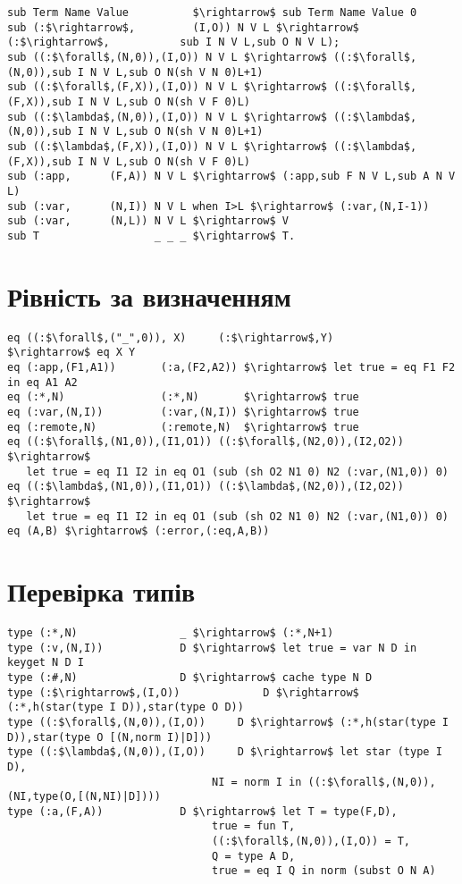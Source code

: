 \begin{lstlisting}[mathescape=true]
sub Term Name Value          $\rightarrow$ sub Term Name Value 0
sub (:$\rightarrow$,         (I,O)) N V L $\rightarrow$ (:$\rightarrow$,           sub I N V L,sub O N V L);
sub ((:$\forall$,(N,0)),(I,O)) N V L $\rightarrow$ ((:$\forall$,(N,0)),sub I N V L,sub O N(sh V N 0)L+1)
sub ((:$\forall$,(F,X)),(I,O)) N V L $\rightarrow$ ((:$\forall$,(F,X)),sub I N V L,sub O N(sh V F 0)L)
sub ((:$\lambda$,(N,0)),(I,O)) N V L $\rightarrow$ ((:$\lambda$,(N,0)),sub I N V L,sub O N(sh V N 0)L+1)
sub ((:$\lambda$,(F,X)),(I,O)) N V L $\rightarrow$ ((:$\lambda$,(F,X)),sub I N V L,sub O N(sh V F 0)L)
sub (:app,      (F,A)) N V L $\rightarrow$ (:app,sub F N V L,sub A N V L)
sub (:var,      (N,I)) N V L when I>L $\rightarrow$ (:var,(N,I-1))
sub (:var,      (N,L)) N V L $\rightarrow$ V
sub T                  _ _ _ $\rightarrow$ T.
\end{lstlisting}


\lstset{xleftmargin=0cm}


   \section{Рівність за визначенням}

\begin{lstlisting}[mathescape=true]
eq ((:$\forall$,("_",0)), X)     (:$\rightarrow$,Y)        $\rightarrow$ eq X Y
eq (:app,(F1,A1))       (:a,(F2,A2)) $\rightarrow$ let true = eq F1 F2 in eq A1 A2
eq (:*,N)               (:*,N)       $\rightarrow$ true
eq (:var,(N,I))         (:var,(N,I)) $\rightarrow$ true
eq (:remote,N)          (:remote,N)  $\rightarrow$ true
eq ((:$\forall$,(N1,0)),(I1,O1)) ((:$\forall$,(N2,0)),(I2,O2)) $\rightarrow$
   let true = eq I1 I2 in eq O1 (sub (sh O2 N1 0) N2 (:var,(N1,0)) 0)
eq ((:$\lambda$,(N1,0)),(I1,O1)) ((:$\lambda$,(N2,0)),(I2,O2)) $\rightarrow$
   let true = eq I1 I2 in eq O1 (sub (sh O2 N1 0) N2 (:var,(N1,0)) 0)
eq (A,B) $\rightarrow$ (:error,(:eq,A,B))
\end{lstlisting}

   \section{Перевірка типів}

\begin{lstlisting}[mathescape=true]
type (:*,N)                _ $\rightarrow$ (:*,N+1)
type (:v,(N,I))            D $\rightarrow$ let true = var N D in keyget N D I
type (:#,N)                D $\rightarrow$ cache type N D
type (:$\rightarrow$,(I,O))             D $\rightarrow$ (:*,h(star(type I D)),star(type O D))
type ((:$\forall$,(N,0)),(I,O))     D $\rightarrow$ (:*,h(star(type I D)),star(type O [(N,norm I)|D]))
type ((:$\lambda$,(N,0)),(I,O))     D $\rightarrow$ let star (type I D),
                                NI = norm I in ((:$\forall$,(N,0)),(NI,type(O,[(N,NI)|D])))
type (:a,(F,A))            D $\rightarrow$ let T = type(F,D),
                                true = fun T,
                                ((:$\forall$,(N,0)),(I,O)) = T,
                                Q = type A D,
                                true = eq I Q in norm (subst O N A)
\end{lstlisting}


